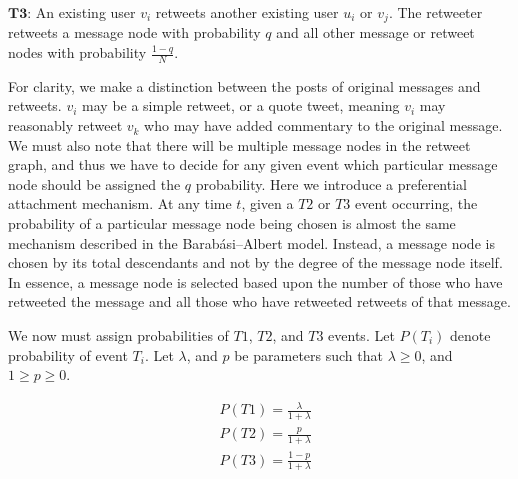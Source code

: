 \vspace{3mm}

\noindent $\pmb{T3}$: An existing user $v_i$ retweets another existing user $u_i$ or $v_j$. The retweeter retweets a message node with probability 
$q$ and all other message or retweet nodes with probability $\frac{1-q}{N}$.

\vspace{3mm}

For clarity, we make a distinction between the posts of original messages and retweets.
$v_i$ may be a simple retweet, or a quote tweet, meaning $v_i$ may reasonably retweet $v_k$ who may have added commentary to the original message.
We must also note that there will be multiple message nodes in the retweet graph, and thus
 we have to decide for any given event
which particular message node should be assigned the $q$ probability.
 Here we introduce a preferential attachment mechanism. At any time $t$,
given a $T2$ or $T3$ event occurring, the probability of a particular message node being chosen is almost the
same mechanism described in the Barabási–Albert model. Instead, a message node is chosen
by its total descendants and not by the degree of the message node itself. In essence, a message node
is selected based upon the number of those who have retweeted the message and all those who have retweeted
retweets of that message.


We now must assign probabilities of $T1$, $T2$, and $T3$ events. Let $P(T_i)$ denote probability of event $T_i$.
Let $\lambda$, and $p$ be parameters such that $\lambda \geq 0$, and $1 \geq p \geq 0$. 

\begin{align*}
    &P(T1) = \frac{\lambda}{1 + \lambda} \\
    &P(T2) = \frac{p}{1 + \lambda} \\
    &P(T3) = \frac{1-p}{1 + \lambda} \\
\end{align*}

